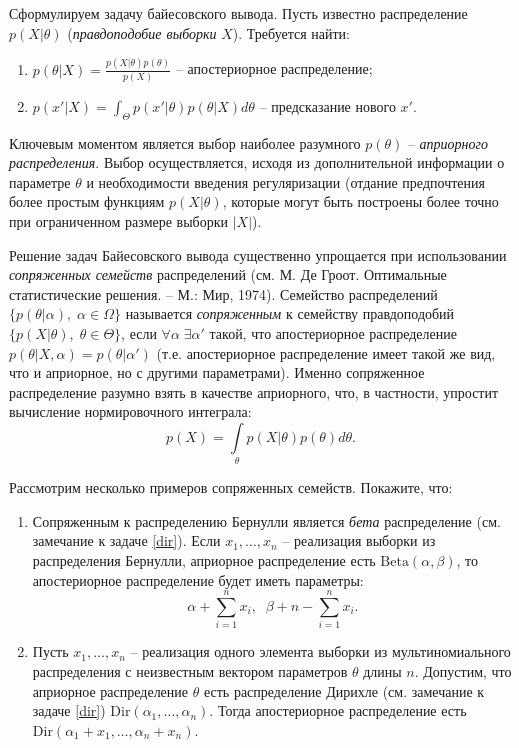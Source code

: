 \begin{problem}
\label{bayes_def}
Сформулируем задачу байесовского вывода. Пусть известно распределение $p(X|\theta)$ (\textit{правдоподобие выборки} $X$). Требуется найти: 
\begin{enumerate}
\item $p(\theta|X) = \frac{p(X|\theta)p(\theta)}{p(X)}$ -- апостериорное распределение;
\item $p(x'|X) = \int_\Theta p(x'|\theta)p(\theta|X) d\theta$ -- предсказание нового $x'$.
\end{enumerate} 

Ключевым моментом является выбор наиболее разумного $p(\theta)$ -- \textit{априорного распределения}. Выбор осуществляется, исходя из дополнительной информации о параметре $\theta$ и необходимости введения регуляризации (отдание предпочтения более простым функциям $p(X | \theta)$, которые могут быть построены более точно при ограниченном размере выборки $|X|$). 

Решение  задач Байесовского вывода существенно упрощается при использовании \textit{сопряженных семейств} распределений (см. М. Де Гроот. Оптимальные статистические решения. -- М.: Мир, 1974).  Семейство распределений $\lbrace p(\theta|\alpha), \; \alpha \in \Omega \rbrace$ называется \textit{сопряженным} к семейству правдоподобий $\lbrace p(X|\theta) , \; \theta \in \Theta \rbrace$, если $\forall 
\alpha \; \exists \alpha'$ такой, что апостериорное распределение $p(\theta|X, \alpha) = p(\theta|\alpha')$ (т.е.  апостериорное распределение имеет такой же вид, что и априорное, но с другими параметрами). Именно  сопряженное распределение разумно взять в качестве априорного, что, в частности, упростит вычисление нормировочного интеграла: 
\[
p(X) = \int \limits_{\theta} p(X|\theta)p(\theta) d \theta.
\] 
 

Рассмотрим несколько примеров сопряженных семейств. Покажите, что:

\begin{enumerate}
\item Сопряженным к распределению Бернулли является \textit{бета}  распределение (см. замечание к задаче \ref{dir}).
Если $x_1, \ldots, x_n$ -- реализация выборки из распределения Бернулли, 
априорное распределение есть $\mathrm{Beta}(\alpha, \beta)$, то апостериорное распределение будет иметь параметры:
\[
\alpha + \sum \limits_{i = 1}^n x_i,  \; \; \beta + n - \sum \limits_{i = 1}^n x_i.  
\]


\item Пусть $x_1, \ldots, x_n$ -- реализация одного элемента выборки из мультиномиального  распределения с неизвестным вектором параметров $\theta$ длины $n$. Допустим, что  априорное распределение  $\theta$ есть распределение Дирихле (см. замечание к задаче \ref{dir}) $\mathrm{Dir}(\alpha_1, \ldots, \alpha_n)$. Тогда апостериорное распределение есть  $\mathrm{Dir}(\alpha_1 + x_1, \ldots, \alpha_n + x_n)$.  


\end{enumerate}
\end{problem}
